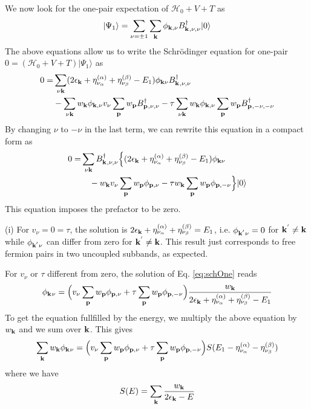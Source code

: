 \documentclass[11pt]{article} %
\begin{document}
We now look for the one-pair expectation of $\mathcal{H}_0+V+T$ as 
\begin{equation}\label{eq:Psi1}
|\Psi_1\rangle=\sum_{\nu=\pm1}\sum_{\mathbf{k}}\phi_{\mathbf{k},\nu}B^{\dagger}_{\mathbf{k}^{ },\nu,\nu}|0\rangle
\end{equation}
The above equations allow us to write the Schr\"odinger equation for one-pair $0=(\mathcal{H}_0+V+T)|\Psi_1\rangle$ as 
\begin{equation}
\begin{split}
0=&\sum_{\nu\mathbf{k}}(2\epsilon_{\mathbf{k}}+\eta_{\nu_{\alpha}}^{(\alpha)}+\eta_{\nu_{\beta}}^{(\beta)}-E_1)\phi_{\mathbf{k}\nu}B^{\dagger}_{\mathbf{k}^{ },\nu,\nu}\\
&-\sum_{\nu\mathbf{k}}w_{\mathbf{k}}\phi_{\mathbf{k},\nu}v_{\nu}\sum_{\mathbf{p}}w_{\mathbf{p}}B^{\dagger}_{\mathbf{p}^{ },\nu,\nu}
 -\tau\sum_{\nu\mathbf{k}}w_{\mathbf{k}}\phi_{\mathbf{k},\nu}\sum_{\mathbf{p}}w_{\mathbf{p}}B^{\dagger}_{\mathbf{p}^{ },-\nu,-\nu}
\end{split}
\end{equation}
By changing $\nu$ to $-\nu$ in the last term, we can rewrite this equation in a compact form as 
\begin{equation}\label{eq:schOne}
\begin{split}
0=&\sum_{\nu\mathbf{k}}B^{\dagger}_{\mathbf{k}^{ },\nu,\nu}\Big\{(2\epsilon_{\mathbf{k}}+\eta_{\nu_{\alpha}}^{(\alpha)}+\eta_{\nu_{\beta}}^{(\beta)}-E_1)\phi_{\mathbf{k}\nu}\\
&\quad-w_{\mathbf{k}}v_{\nu}\sum_{\mathbf{p}}w_{\mathbf{p}}\phi_{\mathbf{p},\nu}-\tau{}w_{\mathbf{k}}\sum_{\mathbf{p}}w_{\mathbf{p}}\phi_{\mathbf{p},-\nu}\Big\}|0\rangle
\end{split}
\end{equation}
This equation imposes the prefactor to be zero. 

(i) For $v_{\nu}=0=\tau$, the solution is $2\epsilon_{\mathbf{k}}+\eta_{\nu_{\alpha}}^{(\alpha)}+\eta_{\nu_{\beta}}^{(\beta)}=E_1$, i.e. $\phi_{\mathbf{k}^{'}\nu}=0$ for $\mathbf{k}^{'}\neq\mathbf{k}$ while $\phi_{\mathbf{k}^{'}\nu}$ can differ from zero for  $\mathbf{k}^{'}\neq\mathbf{k}$. This result just corresponds to free fermion pairs in two uncoupled subbands, as expected. 

For $v_{\nu}$ or $\tau$ different from zero, the solution of Eq. \ref{eq:schOne} reads
\begin{equation}\label{eq:phi}
\phi_{\mathbf{k}^{}\nu}=\Big(v_{\nu}\sum_{\mathbf{p}}w_{\mathbf{p}}\phi_{\mathbf{p},\nu}+\tau{}\sum_{\mathbf{p}}w_{\mathbf{p}}\phi_{\mathbf{p},-\nu}\Big)
\frac{w_{\mathbf{k}}}{2\epsilon_{\mathbf{k}}+\eta_{\nu_{\alpha}}^{(\alpha)}+\eta_{\nu_{\beta}}^{(\beta)}-E_1}
\end{equation}
To get the equation fullfilled by the energy, we multiply the above equation by $w_{\mathbf{k}}$ and we sum over $\mathbf{k}$.  This gives 
\begin{equation}\label{eq:phiS}
\sum_{\mathbf{k}}w_{\mathbf{k}}\phi_{\mathbf{k}^{}\nu}=\Big(v_{\nu}\sum_{\mathbf{p}}w_{\mathbf{p}}\phi_{\mathbf{p},\nu}+\tau{}\sum_{\mathbf{p}}w_{\mathbf{p}}\phi_{\mathbf{p},-\nu}\Big)
S(E_1-\eta_{\nu_{\alpha}}^{(\alpha)}-\eta_{\nu_{\beta}}^{(\beta)})
\end{equation}
where we have 
\begin{equation}
S(E)=\sum_{\mathbf{k}}\frac{w_{\mathbf{k}}}{2\epsilon_{\mathbf{k}}-E}
\end{equation}
\end{document}
